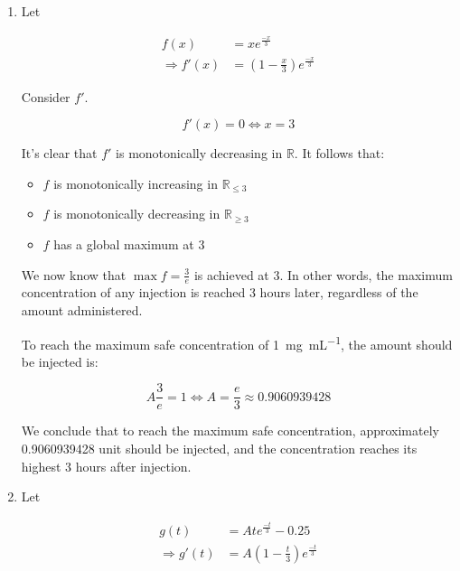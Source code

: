 \documentclass[../../../../Assignments]{subfiles}
\begin{document}
\begin{solution}
    \begin{enumerate}[label = \alph*)]
        \item Let

            \begin{align*}
                             f(x) &= xe^{\frac{-x}{3}} \\
                \Rightarrow f'(x) &= \left(1 - \frac{x}{3}\right) e^{\frac{-x}{3}}
            \end{align*}

            Consider \(f'\).

            \[f'(x) = 0 \iff x = 3\]

            It's clear that \(f'\) is monotonically decreasing in
            \(\mathbb{R}\). It follows that:

            \begin{itemize}
                \item \(f\) is monotonically increasing in \(\mathbb{R}_{\leq 3}\)
                \item \(f\) is monotonically decreasing in \(\mathbb{R}_{\geq 3}\)
                \item \(f\) has a global maximum at \num{3}
            \end{itemize}

            We now know that \(\max{f} = \frac{3}{e}\) is achieved at \num{3}.
            In other words, the maximum concentration of any injection is
            reached \num{3} hours later, regardless of the amount administered.

            To reach the maximum safe concentration of
            \SI{1}{\milli\gram\per\milli\liter}, the amount should be injected
            is:

            \[A \frac{3}{e} = 1 \iff A = \frac{e}{3} \approx \num{0.9060939428}\]

            We conclude that to reach the maximum safe concentration,
            approximately \num{0.9060939428} unit should be injected, and the
            concentration reaches its highest 3 hours after injection.

        \item Let

            \begin{align*}
                             g(t) &= Ate^{\frac{-t}{3}} - 0.25 \\
                \Rightarrow g'(t) &= A\left(1 - \frac{t}{3}\right) e^{\frac{-t}{3}}
            \end{align*}


\end{enumerate}
\end{solution}
\end{document}
